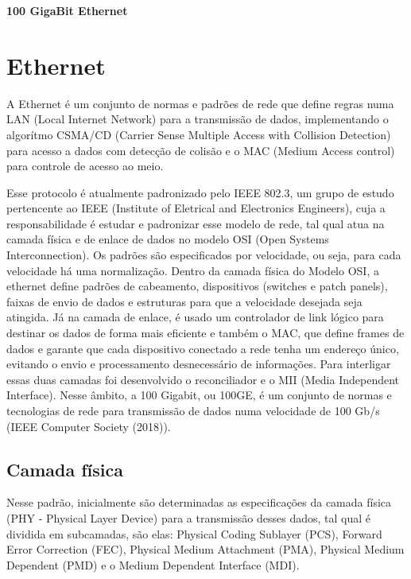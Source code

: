 \documentclass[a4paper,12pt]{article}
\begin{document}
\begin{center}
\textbf{{\LARGE 100 GigaBit Ethernet}} \\ \vspace{0.5cm}
\end{center}

\section{Ethernet}
A Ethernet é um conjunto de normas e padrões de rede que define regras numa LAN (Local Internet Network) para a transmissão de dados, implementando o algorítmo CSMA/CD (Carrier Sense Multiple Access with Collision Detection) para acesso a dados com detecção de colisão e o MAC (Medium Access control) para controle de acesso ao meio.

Esse protocolo é atualmente padronizado pelo IEEE 802.3, um grupo de estudo pertencente ao IEEE (Institute of Eletrical and Electronics Engineers), cuja a responsabilidade é estudar e padronizar esse modelo de rede, tal qual atua na camada física e de enlace de dados no modelo OSI (Open Systems Interconnection). Os padrões são especificados por velocidade, ou seja, para cada velocidade há uma normalização.
Dentro da camada física do Modelo OSI, a ethernet define padrões de cabeamento, dispositivos (switches e patch panels), faixas de envio de dados e estruturas para que a velocidade desejada seja atingida.
Já na camada de enlace, é usado um controlador de link lógico para destinar os dados de forma mais eficiente e também o MAC, que define frames de dados e garante que cada dispositivo conectado a rede tenha um endereço único, evitando o envio e processamento desnecessário de informações.
Para interligar essas duas camadas foi desenvolvido o reconciliador e o MII (Media Independent Interface).
Nesse âmbito, a 100 Gigabit, ou 100GE, é um conjunto de normas e tecnologias de rede para transmissão de dados numa velocidade de 100 Gb/s (IEEE Computer Society (2018)).

\subsection{Camada física}
Nesse padrão, inicialmente são determinadas as especificações da camada física (PHY - Physical Layer Device) para a transmissão desses dados, tal qual é dividida em subcamadas, são elas: Physical Coding Sublayer (PCS), Forward Error Correction (FEC), Physical Medium Attachment (PMA), Physical Medium Dependent (PMD) e o Medium Dependent Interface (MDI).
\end{document}
